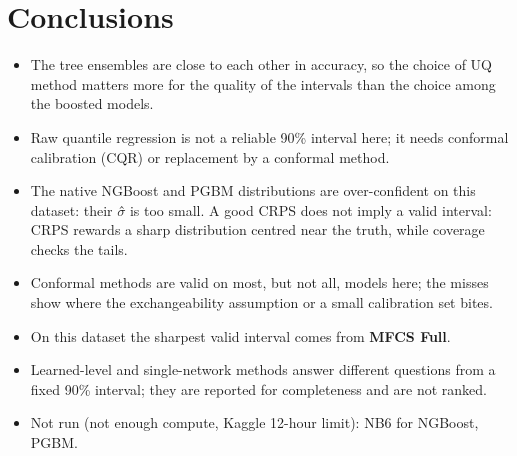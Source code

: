 \documentclass[11pt]{article}
\begin{document}
\section{Conclusions}
\begin{itemize}
\item The tree ensembles are close to each other in accuracy, so the choice of UQ method matters more for the quality of the intervals than the choice among the boosted models.
\item Raw quantile regression is not a reliable 90\% interval here; it needs conformal calibration (CQR) or replacement by a conformal method.
\item The native NGBoost and PGBM distributions are over-confident on this dataset: their $\sigma$̂ is too small. A good CRPS does not imply a valid interval: CRPS rewards a sharp distribution centred near the truth, while coverage checks the tails.
\item Conformal methods are valid on most, but not all, models here; the misses show where the exchangeability assumption or a small calibration set bites.
\item On this dataset the sharpest valid interval comes from \textbf{MFCS Full}.
\item Learned-level and single-network methods answer different questions from a fixed 90\% interval; they are reported for completeness and are not ranked.
\item Not run (not enough compute, Kaggle 12-hour limit): NB6 for NGBoost, PGBM.
\end{itemize}
\end{document}
